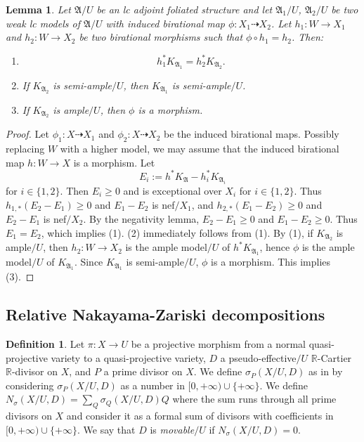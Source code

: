 \documentclass[12pt]{amsart}
\numberwithin{equation}{section}
\newcommand{\Rr}{\mathbb{R}}
\newcommand{\Aa}{{\mathfrak{A}}}
\newtheorem{lem}[thm]{Lemma}
\theoremstyle{definition}
\newtheorem{defn}[thm]{Definition}
\theoremstyle{definition}
\theoremstyle{definition}
\begin{document}
\begin{lem}\label{lem: g-pair version bir12 2.7}
Let $\Aa/U$ be an lc adjoint foliated structure and let $\Aa_1/U$, $\Aa_2/U$ be two weak lc models of $\Aa/U$ with induced birational map $\phi: X_1\dashrightarrow X_2$. Let $h_1: W\rightarrow X_1$ and $h_2: W\rightarrow X_2$ be two birational morphisms such that $\phi\circ h_1=h_2$. Then:
\begin{enumerate}
    \item $$h_1^*K_{\Aa_1}=h_2^*K_{\Aa_2}.$$
    \item If $K_{\Aa_2}$ is semi-ample$/U$, then $K_{\Aa_1}$ is semi-ample$/U$.
    \item If $K_{\Aa_2}$ is ample$/U$, then $\phi$ is a morphism.
\end{enumerate}
\end{lem}
\begin{proof}
Let $\phi_1: X\dashrightarrow X_1$ and $\phi_2: X\dashrightarrow X_2$ be the induced birational maps. Possibly replacing $W$ with a higher model, we may assume that the induced birational map $h: W\rightarrow X$ is a morphism. Let $$E_i:=h^*K_{\Aa}-h_i^*K_{\Aa_i}$$
for $i\in\{1,2\}$. Then $E_i\geq 0$ and is exceptional over $X_i$ for $i\in\{1,2\}$. Thus $h_{1,*}(E_2-E_1)\geq 0$ and $E_1-E_2$ is nef$/X_1$, and $h_{2,*}(E_1-E_2)\geq 0$ and $E_2-E_1$ is nef$/X_2$. By the negativity lemma, $E_2-E_1\geq 0$ and $E_1-E_2\geq 0$. Thus $E_1=E_2$, which implies (1). (2) immediately follows from (1). By (1), if $K_{\Aa_2}$ is ample$/U$, then $h_2: W\rightarrow X_2$ is the ample model$/U$ of $h^*K_{\Aa_1}$, hence $\phi$ is the ample model$/U$ of $K_{\Aa_1}$. Since $K_{\Aa_1}$ is semi-ample$/U$, $\phi$ is a morphism. This implies (3).
\end{proof}

\subsection{Relative Nakayama-Zariski decompositions}

\begin{defn}
    Let $\pi\colon X\rightarrow U$ be a projective morphism from a normal quasi-projective variety to a quasi-projective variety, $D$ a pseudo-effective$/U$ $\Rr$-Cartier $\Rr$-divisor on $X$, and $P$ a prime divisor on $X$. We define $\sigma_{P}(X/U,D)$ as in \cite[Definition 3.1]{LX23} by considering $\sigma_{P}(X/U,D)$ as a number in  $[0,+\infty)\cup\{+\infty\}$. We define $N_{\sigma}(X/U,D)=\sum_Q\sigma_Q(X/U,D)Q$
    where the sum runs through all prime divisors on $X$ and consider it as a formal sum of divisors with coefficients in $[0,+\infty)\cup\{+\infty\}$. We say that $D$ is \emph{movable$/U$} if $N_{\sigma}(X/U,D)=0$.
\end{defn}
\end{document}
